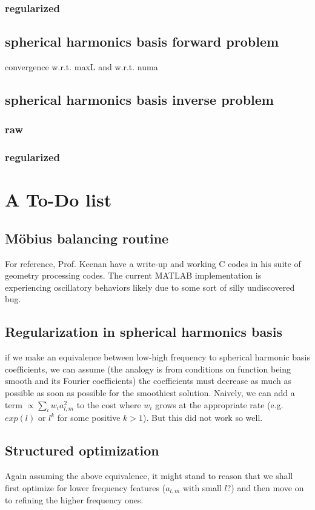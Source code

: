 \documentclass[11pt]{article}
\theoremstyle{definition}
\begin{document}
\subsubsection{regularized}

\subsection{spherical harmonics basis forward problem}
convergence w.r.t. maxL and w.r.t. numa

\subsection{spherical harmonics basis inverse problem}
\subsubsection{raw}

\subsubsection{regularized}

\section{A To-Do list}
\subsection{M\"obius balancing routine}
For reference, Prof. Keenan have a write-up and working C codes in his suite of geometry processing codes.
The current MATLAB implementation is experiencing oscillatory behaviors likely due to some sort of silly undiscovered bug.

\subsection{Regularization in spherical harmonics basis}
if we make an equivalence between low-high frequency to spherical harmonic basis coefficients, we can assume (the analogy is from conditions on function being smooth and its Fourier coefficients) the coefficients must decrease as much as possible as soon as possible for the smoothiest solution.
Naively, we can add a term $\propto \sum_i w_i a_{l,m}^2$ to the cost where $w_i$ grows at the appropriate rate (e.g. $exp(l)$ or $l^k$ for some positive $k>1$). But this did not work so well.

\subsection{Structured optimization}
Again assuming the above equivalence, it might stand to reason that we shall first optimize for lower frequency features ($a_{l,m}$ with small $l$?) and then move on to refining the higher frequency ones.
\end{document}
